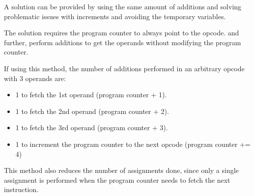 A solution can be provided by using the same amount of additions and solving problematic issues with increments and avoiding the temporary variables.

The solution requires the program counter to always point to the opcode. and further, perform additions to get the operands without modifying the program counter.

If using this method, the number of additions performed in an arbitrary opcode with 3 operands are:

\begin{itemize}
    \item 1 to fetch the 1st operand (program counter + 1).
    \item 1 to fetch the 2nd operand (program counter + 2).
    \item 1 to fetch the 3rd operand (program counter + 3).
    \item 1 to increment the program counter to the next opcode (program counter += 4)
\end{itemize}

This method also reduces the number of assignments done, since only a single assignment is performed when the program counter needs to fetch the next instruction.
